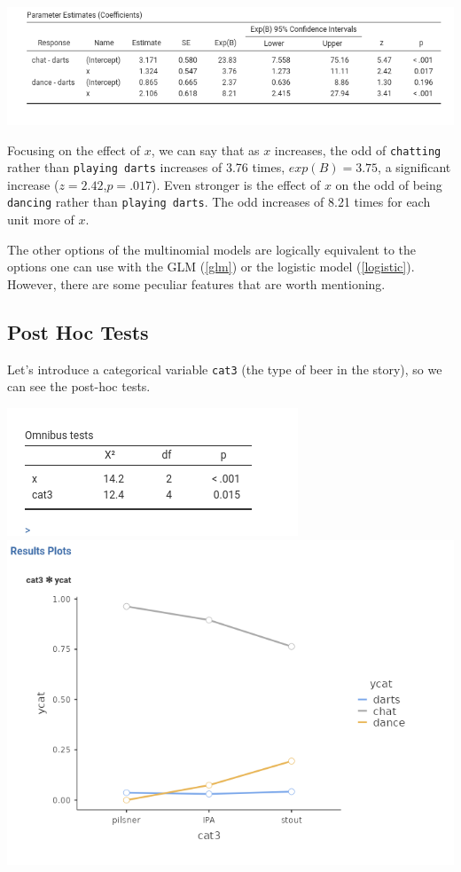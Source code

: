 \documentclass[
]{book}
\begin{document}
\includegraphics{bookletpics/3_multi_output4.png}

Focusing on the effect of \(x\), we can say that as \(x\) increases, the odd of \texttt{chatting} rather than \texttt{playing\ darts} increases of 3.76 times, \(exp(B)=3.75\), a significant increase (\(z=2.42\),\(p=.017\)). Even stronger is the effect of \(x\) on the odd of being \texttt{dancing} rather than \texttt{playing\ darts}. The odd increases of 8.21 times for each unit more of \(x\).

The other options of the multinomial models are logically equivalent to the options one can use with the GLM (\ref{glm}) or the logistic model (\ref{logistic}). However, there are some peculiar features that are worth mentioning.

\hypertarget{post-hoc-tests-1}{%
\subsection{Post Hoc Tests}\label{post-hoc-tests-1}}

Let's introduce a categorical variable \texttt{cat3} (the type of beer in the story), so we can see the post-hoc tests.

\includegraphics{bookletpics/3_multi_output5.png}
\includegraphics{bookletpics/3_multi_plot3.png}
\end{document}
